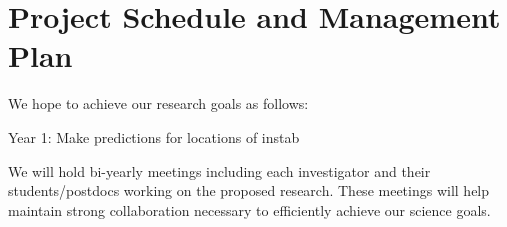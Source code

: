 \section{Project Schedule and Management Plan}

We hope to achieve our research goals as follows:

Year 1: Make predictions for locations of instab 

We will  hold bi-yearly meetings including each investigator and their students/postdocs working on the proposed research. These meetings will help maintain strong collaboration necessary to efficiently achieve our science goals.
